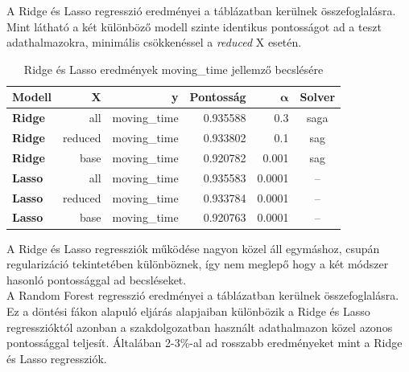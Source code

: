 A Ridge és Lasso regresszió eredményei a  táblázatban kerülnek összefoglalásra. Mint látható a két különböző modell szinte identikus pontosságot ad a teszt adathalmazokra, minimális csökkenéssel a \textit{reduced} X esetén. 
\begin{table}[!h]
	\centering
	\begin{tabular}{|l|r|r|r|r|c|}
		\hline
		\textbf{Modell} & \textbf{X} & \textbf{y}   & \multicolumn{1}{l|}{\textbf{Pontosság}} & \textbf{$\boldsymbol\alpha$} & \multicolumn{1}{l|}{\textbf{Solver}} \\ \hline
		\textbf{Ridge}  & all        & moving\_time & 0.935588                                & 0.3              & saga                                 \\ \hline
		\textbf{Ridge}  & reduced    & moving\_time & 0.933802                                & 0.1              & sag                                 \\ \hline
		\textbf{Ridge}  & base    & moving\_time & 0.920782                                  & 0.001              & sag                                  \\ \hline
		\textbf{Lasso}  & all        & moving\_time & 0.935583                                & 0.0001            & --                                   \\ \hline
		\textbf{Lasso}  & reduced    & moving\_time & 0.933784                                & 0.0001            & --                                   \\ \hline
		\textbf{Lasso}  & base    & moving\_time & 0.920763                                  & 0.0001            & --                                   \\ \hline
	\end{tabular}
	\caption{Ridge és Lasso eredmények moving\_time jellemző becslésére}
	\label{table:movingTimeRidgeAndLasso}
\end{table}

A Ridge és Lasso regressziók működése nagyon közel áll egymáshoz, csupán regularizáció tekintetében különböznek, így nem meglepő hogy a két módszer hasonló pontossággal ad becsléseket.\\[6pt]

\noindent A Random Forest regresszió eredményei a  táblázatban kerülnek összefoglalásra. Ez a döntési fákon alapuló eljárás alapjaiban különbözik a Ridge és Lasso regresszióktól azonban a szakdolgozatban használt adathalmazon közel azonos pontossággal teljesít. Általában 2-3\%-al ad rosszabb eredményeket mint a Ridge és Lasso regressziók.

